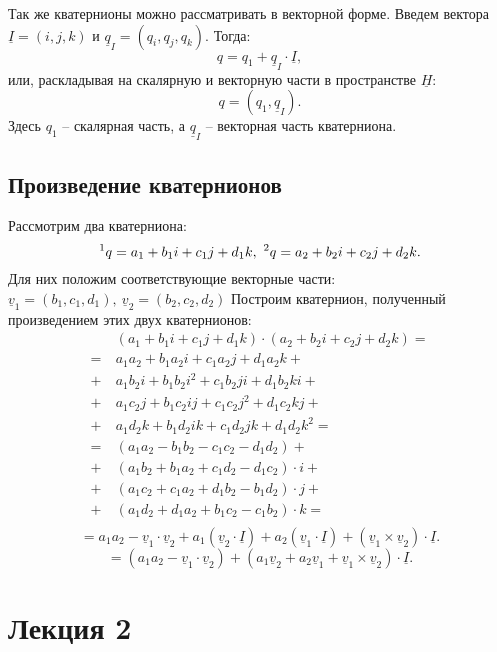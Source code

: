 \documentclass[fleqn]{extarticle}
\newcommand{\pares}[1]{ \left( #1 \right) }
\newcommand{\uv}{\underline{v}}
\newcommand{\uI}{\underline{I}}
\newcommand{\pq}[1]{\prescript{#1}{}{q}}
\begin{document}
			Так же кватернионы можно рассматривать в векторной форме. Введем вектора $\uI = (i, j, k)$ и $\underline{q}_I = \pares{q_i, q_j, q_k}$. Тогда:
			\[ q = q_1 + \underline{q}_I \cdot \uI, \]
			или, раскладывая на скалярную и векторную части в пространстве $\underline{H}$:
			\[ q = \pares{q_1, \underline{q}_I}. \]
			Здесь $q_1$ -- скалярная часть, а $\underline{q}_I$ -- векторная часть кватерниона.

		\subsection{Произведение кватернионов}
			Рассмотрим два кватерниона:
			\[ \pq{1} = a_1 + b_1 i + c_1 j + d_1 k, ~ \pq{2} = a_2 + b_2 i + c_2 j + d_2 k. \]
			Для них положим соответствующие векторные части: $\uv_1 = \pares{b_1, c_1, d_1}, ~ \uv_2 = \pares{b_2, c_2, d_2}$
			Построим кватернион, полученный произведением этих двух кватернионов:
			\[ \begin{split} 
				&\pares{a_1 + b_1 i + c_1 j + d_1 k} \cdot \pares{a_2 + b_2 i + c_2 j + d_2 k} = \\
				= ~ & a_1 a_2   + b_1 a_2 i   + c_1 a_2 j   + d_1 a_2 k   + \\ 
				+ & a_1 b_2 i + b_1 b_2 i^2 + c_1 b_2 ji  + d_1 b_2 ki  + \\
				+ & a_1 c_2 j + b_1 c_2 ij  + c_1 c_2 j^2 + d_1 c_2 kj  + \\
				+ & a_1 d_2 k + b_1 d_2 ik  + c_1 d_2 jk  + d_1 d_2 k^2 = \\
				= ~ & \pares{a_1 a_2 - b_1 b_2 - c_1 c_2 - d_1 d_2} + \\
				+ & \pares{a_1 b_2 + b_1 a_2 + c_1 d_2 - d_1 c_2} \cdot i + \\
				+ & \pares{a_1 c_2 + c_1 a_2 + d_1 b_2 - b_1 d_2} \cdot j + \\
				+ & \pares{a_1 d_2 + d_1 a_2 + b_1 c_2 - c_1 b_2} \cdot k = \\
			\end{split} \]
			\[ = a_1 a_2 - \uv_1 \cdot \uv_2 + a_1 \pares{\uv_2 \cdot \uI} + a_2 \pares{\uv_1 \cdot \uI} + \pares{\uv_1 \times \uv_2} \cdot \uI. \]
			\[ = \pares{a_1 a_2 - \uv_1 \cdot \uv_2} + \pares{a_1 \uv_2 + a_2 \uv_1 + \uv_1 \times \uv_2} \cdot \uI. \]

	\section{Лекция 2}
\end{document}

